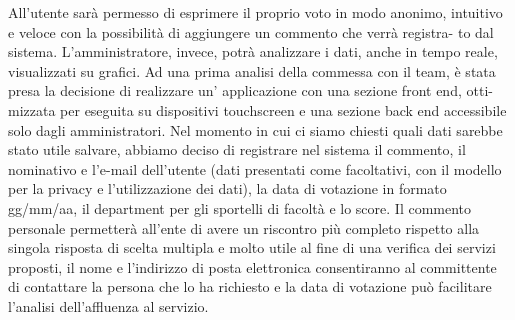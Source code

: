 All'utente sarà permesso di esprimere il proprio voto in modo anonimo,
intuitivo e veloce con la possibilità di aggiungere un commento che verrà registra-
to dal sistema. L'amministratore, invece, potrà analizzare i dati, anche in tempo
reale, visualizzati su grafici. Ad una prima analisi della commessa con il team, è stata
presa la decisione di realizzare un' applicazione con una sezione front end, otti-
mizzata per eseguita su dispositivi touchscreen e una sezione back end accessibile
solo dagli amministratori.
Nel momento in cui ci siamo chiesti quali dati sarebbe stato utile salvare,
abbiamo deciso di registrare nel sistema il commento, il nominativo e l'e-mail
dell'utente (dati presentati come facoltativi, con il modello per la privacy e
l'utilizzazione dei dati), la data di votazione in formato gg/mm/aa, il
department per gli sportelli di facoltà e lo score. Il commento personale
permetterà all'ente di avere un riscontro più completo rispetto alla singola
risposta di scelta multipla e molto utile al fine di una verifica dei servizi
proposti, il nome e l'indirizzo di posta elettronica consentiranno al
committente di contattare la persona che lo ha richiesto e la data di votazione
può facilitare l'analisi dell'affluenza al servizio.

